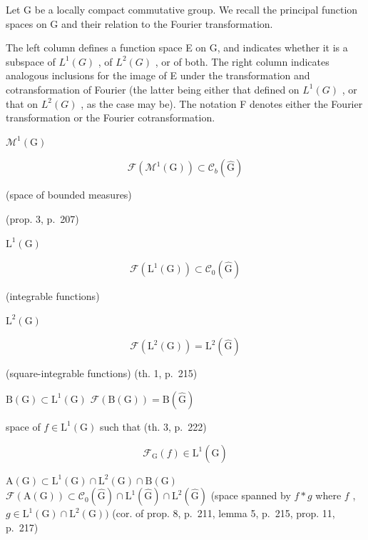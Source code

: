 \backmatter
{}


Let G be a locally compact commutative group. We recall the principal function spaces on G and their relation to the Fourier transformation.

The left column defines a function space E on G, and indicates whether it is a subspace of \(L^{1}(G)\) , of \(L^{2}(G)\) , or of both. The right column indicates analogous inclusions for the image of E under the transformation and cotransformation of Fourier (the latter being either that defined on \(L^{1}(G)\) , or that on \(L^{2}(G)\) , as the case may be). The notation F denotes either the Fourier transformation or the Fourier cotransformation.

\(\mathcal{M}^1 (\mathrm{G})\)

\[
\mathcal {F} (\mathcal {M} ^ {1} (\mathrm{G})) \subset \mathcal {C} _ {b} (\widehat {\mathrm{G}})
\]

(space of bounded measures)

(prop. 3, p.~207)

\(\mathrm{L}^{1}(\mathrm{G})\)

\[
\mathcal {F} (\mathrm{L} ^ {1} (\mathrm{G})) \subset \mathcal {C} _ {0} (\widehat {\mathrm{G}})
\]

(integrable functions)

\(\mathrm{L}^2 (\mathrm{G})\)

\[
\mathscr {F} (\mathrm{L} ^ {2} (\mathrm{G})) = \mathrm{L} ^ {2} (\widehat {\mathrm{G}})
\]

(square-integrable functions) (th. 1, p.~215)

\(\mathrm{B(G)}\subset \mathrm{L}^{1}(\mathrm{G})\) \(\mathcal{F}(\mathrm{B(G)}) = \mathrm{B}(\widehat{\mathrm{G}})\)

space of \(f \in \mathrm{L}^1(\mathrm{G})\) such that (th. 3, p.~222)

\[
\mathcal {F} _ {\mathrm{G}} (f) \in \mathrm{L} ^ {1} (\widehat {\mathrm{G}})
\]

\(\mathrm{A(G)}\subset \mathrm{L}^1 (\mathrm{G})\cap \mathrm{L}^2 (\mathrm{G})\cap \mathrm{B(G)}\) \(\mathcal{F}(\mathrm{A(G)})\subset \mathcal{C}_0(\widehat{\mathrm{G}})\cap \mathrm{L}^1 (\widehat{\mathrm{G}})\cap \mathrm{L}^2 (\widehat{\mathrm{G}})\) (space spanned by \(f*g\) where \(f\) , \(g\in \mathrm{L}^{1}(\mathrm{G})\cap \mathrm{L}^{2}(\mathrm{G}))\) (cor. of prop. 8, p.~211, lemma 5, p.~215, prop. 11, p.~217)


